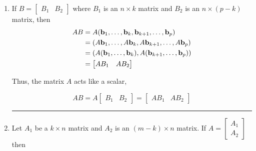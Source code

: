 \begin{enumerate}
	\item If $B = \begin{bmatrix} B_1 &	B_2 \end{bmatrix}$ where $B_1$ is an $n \times k$ matrix and $B_2$ is an $n \times (p-k)$ matrix, then
	\begin{align*}
	 AB 	&= A ({\bf b}_1, \dots, {\bf b}_k, {\bf b}_{k+1}, \dots, {\bf b}_p) \\
	 	&= (A{\bf b}_1, \dots, A{\bf b}_k, A{\bf b}_{k+1}, \dots, A{\bf b}_p)\\
		&= (A({\bf b}_1, \dots, {\bf b}_k), A({\bf b}_{k+1}, \dots, {\bf b}_p))\\
		&= \begin{bmatrix} AB_1	& 	AB_2 \end{bmatrix}
	\end{align*}
	
	Thus, the matrix $A$ acts like a scalar,
	
	\begin{tcolorbox}[colback=yellow!10!,colframe=gray!15!]
	\[
	AB = A \begin{bmatrix} B_1	& 	B_2 \end{bmatrix} =  \begin{bmatrix} AB_1	& 	AB_2 \end{bmatrix} 
	\]
	\end{tcolorbox}
	
	
\rule[0.01in]{\textwidth}{0.0025in}

	
	\item Let $A_1$ be a $k \times n$ matrix and $A_2$ is an $(m - k) \times n$ matrix.  If $A = \begin{bmatrix} A_1 \\ A_2 \end{bmatrix}$
	then 
	

\end{enumerate}
